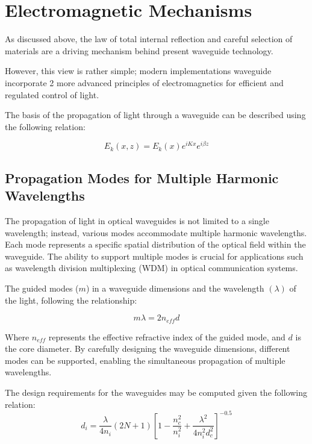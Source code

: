 \documentclass[10pt]{article}
\begin{document}
\section{Electromagnetic Mechanisms}

As discussed above, the law of total internal reflection and careful selection of materials are a driving mechanism behind present waveguide technology.

However, this view is rather simple; modern implementations waveguide incorporate 2 more advanced principles of electromagnetics for 
efficient and regulated control of light. 

The basis of the propagation of light through a waveguide can be described using the following relation:

\begin{equation}
    E_k(x, z) = E_k(x)e^{iKx}e^{i\beta z}

\end{equation}

\subsection{Propagation Modes for Multiple Harmonic Wavelengths}
The propagation of light in optical waveguides is not limited to a single wavelength; instead, various modes accommodate multiple harmonic wavelengths. Each mode represents a specific spatial distribution of the optical field within the waveguide. The ability to support multiple modes is crucial for applications such as wavelength division multiplexing (WDM) in optical communication systems.

The guided modes ($m$) in a waveguide dimensions and the wavelength $(\lambda)$ of the light, following the relationship:

\begin{equation}
    m\lambda = 2n_{eff}d
\end{equation}

Where $n_{eff}$ represents the effective refractive index of the guided mode, and
$d$ is the core diameter. By carefully designing the waveguide dimensions, different modes can be supported, enabling the simultaneous propagation of multiple wavelengths.

The design requirements for the waveguides may be computed given the following relation:
\begin{equation}
    d_i = \frac{\lambda}{4n_i}(2N + 1)\left[1 - \frac{n_c^2}{n_i^2} + \frac{\lambda^2}{4n_i^2d_c^2}\right]^{-0.5}

\end{equation}
\end{document}
